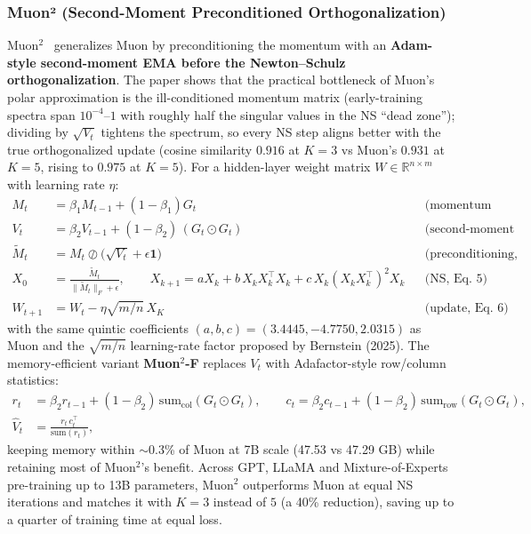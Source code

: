 \subsubsection{Muon² (Second-Moment Preconditioned Orthogonalization)}
Muon$^2$~\citep{liu_muon2_2026} generalizes Muon by preconditioning the momentum with an
\textbf{Adam-style second-moment EMA before the Newton--Schulz orthogonalization}. The
paper shows that the practical bottleneck of Muon's polar approximation is the
ill-conditioned momentum matrix (early-training spectra span $10^{-4}$--$1$ with roughly
half the singular values in the NS ``dead zone''); dividing by $\sqrt{V_t}$ tightens the
spectrum, so every NS step aligns better with the true orthogonalized update (cosine
similarity $0.916$ at $K{=}3$ vs Muon's $0.931$ at $K{=}5$, rising to $0.975$ at
$K{=}5$). For a hidden-layer weight matrix $W \in \mathbb{R}^{n \times m}$ with learning
rate $\eta$:
\begin{align}
M_t &= \beta_1 M_{t-1} + (1-\beta_1) G_t && \text{(momentum EMA, Eq.~2)} \\
V_t &= \beta_2 V_{t-1} + (1-\beta_2)\, (G_t \odot G_t) && \text{(second-moment EMA, Eq.~3)} \\
\widetilde{M}_t &= M_t \oslash \big(\sqrt{V_t} + \epsilon \mathbf{1}\big) && \text{(preconditioning, Eq.~4)} \\
X_0 &= \frac{\widetilde{M}_t}{\|\widetilde{M}_t\|_F + \epsilon}, \qquad
X_{k+1} = aX_k + b\, X_k X_k^\top X_k + c\, X_k (X_k X_k^\top)^2 X_k && \text{(NS, Eq.~5)} \\
W_{t+1} &= W_t - \eta \sqrt{m/n}\, X_K && \text{(update, Eq.~6)}
\end{align}
with the same quintic coefficients $(a,b,c)=(3.4445,-4.7750,2.0315)$ as Muon and the
$\sqrt{m/n}$ learning-rate factor proposed by Bernstein (2025). The memory-efficient
variant \textbf{Muon$^2$-F} replaces $V_t$ with Adafactor-style row/column statistics:
\begin{align}
r_t &= \beta_2 r_{t-1} + (1-\beta_2)\,\mathrm{sum}_{\mathrm{col}}(G_t \odot G_t), \qquad
c_t = \beta_2 c_{t-1} + (1-\beta_2)\,\mathrm{sum}_{\mathrm{row}}(G_t \odot G_t), \\
\widehat{V}_t &= \frac{r_t\, c_t^\top}{\mathrm{sum}(r_t)},
\end{align}
keeping memory within $\sim$0.3\% of Muon at 7B scale (47.53 vs 47.29 GB) while retaining
most of Muon$^2$'s benefit. Across GPT, LLaMA and Mixture-of-Experts pre-training up to
13B parameters, Muon$^2$ outperforms Muon at equal NS iterations and matches it with
$K{=}3$ instead of $5$ (a 40\% reduction), saving up to a quarter of training time at
equal loss.

